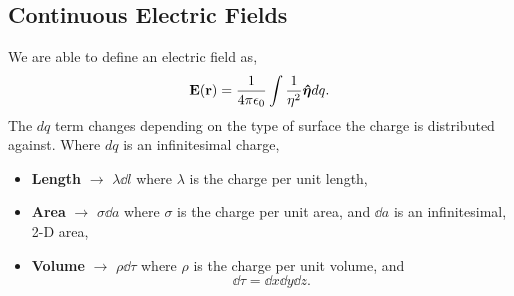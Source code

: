 \documentclass{book}
\begin{document}
\subsection{Continuous Electric Fields}
We are able to define an electric field as,
\begin{equation}
    \vb{E}(\vb{r}) = \frac{1}{4\pi\epsilon_0}\int \frac{1}{\eta^2}\vu*{\eta}dq.
\end{equation}
The $dq$ term changes depending on the type of surface the charge is distributed against. Where $dq$ is an infinitesimal charge,
\begin{itemize}
    \item \textbf{Length} $\to$ $\lambda \dd{l}$ where $\lambda$ is the charge per unit length,
    \item \textbf{Area} $\to$ $\sigma \dd{a}$ where $\sigma$ is the charge per unit area, and $\dd{a}$ is an infinitesimal, 2-D area,
    \item \textbf{Volume} $\to$ $\rho \dd{\tau}$ where $\rho$ is the charge per unit volume, and $$\dd{\tau} = \dd{x}\dd{y}\dd{z}.$$
\end{itemize}
\end{document}
